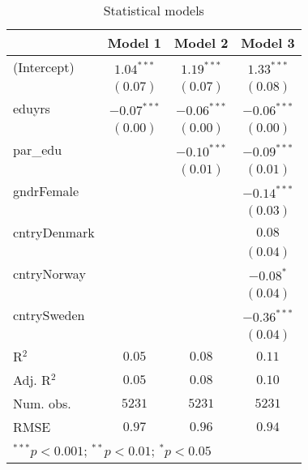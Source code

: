 
\begin{table}
\begin{center}
\begin{tabular}{l c c c}
\hline
 & Model 1 & Model 2 & Model 3 \\
\hline
(Intercept)  & $1.04^{***}$  & $1.19^{***}$  & $1.33^{***}$  \\
             & $(0.07)$      & $(0.07)$      & $(0.08)$      \\
eduyrs       & $-0.07^{***}$ & $-0.06^{***}$ & $-0.06^{***}$ \\
             & $(0.00)$      & $(0.00)$      & $(0.00)$      \\
par\_edu     &               & $-0.10^{***}$ & $-0.09^{***}$ \\
             &               & $(0.01)$      & $(0.01)$      \\
gndrFemale   &               &               & $-0.14^{***}$ \\
             &               &               & $(0.03)$      \\
cntryDenmark &               &               & $0.08$        \\
             &               &               & $(0.04)$      \\
cntryNorway  &               &               & $-0.08^{*}$   \\
             &               &               & $(0.04)$      \\
cntrySweden  &               &               & $-0.36^{***}$ \\
             &               &               & $(0.04)$      \\
\hline
R$^2$        & $0.05$        & $0.08$        & $0.11$        \\
Adj. R$^2$   & $0.05$        & $0.08$        & $0.10$        \\
Num. obs.    & $5231$        & $5231$        & $5231$        \\
RMSE         & $0.97$        & $0.96$        & $0.94$        \\
\hline
\multicolumn{4}{l}{\scriptsize{$^{***}p<0.001$; $^{**}p<0.01$; $^{*}p<0.05$}}
\end{tabular}
\caption{Statistical models}
\label{table:coefficients}
\end{center}
\end{table}
